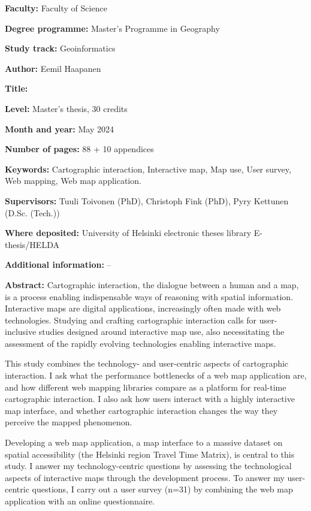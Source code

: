 \begin{spacing}{1}
\setlength{\parskip}{4pt}

\textbf{Faculty:} Faculty of Science

\textbf{Degree programme:} Master's Programme in Geography

\textbf{Study track:} Geoinformatics

\textbf{Author:} Eemil Haapanen

\textbf{Title:} \mytitle

\textbf{Level:} Master's thesis, 30 credits

\textbf{Month and year:} May 2024

\textbf{Number of pages:} 88 + 10 appendices

\textbf{Keywords:}
Cartographic interaction,
Interactive map,
Map use,
User survey,
Web mapping,
Web map application.

\textbf{Supervisors:} Tuuli Toivonen (PhD), Christoph Fink (PhD), Pyry Kettunen (D.Sc. (Tech.))

\textbf{Where deposited:} University of Helsinki electronic theses library E-thesis/HELDA

\textbf{Additional information:} --

\textbf{Abstract:}
Cartographic interaction, the dialogue between a human and a map, is
a process enabling indispensable ways of reasoning with spatial information.
Interactive maps are digital applications,
increasingly often made with web technologies.
Studying and crafting cartographic interaction calls for
user-inclusive studies designed around interactive map use,
also necessitating the assessment of the rapidly evolving technologies enabling interactive maps.

This study combines the technology- and user-centric aspects of cartographic interaction.
I ask what the performance bottlenecks of a web map application are,
and how different web mapping libraries compare as a platform for real-time cartographic interaction.
I also ask how users interact with a highly interactive map interface,
and whether cartographic interaction changes the way they perceive the mapped phenomenon.

Developing a web map application,
a map interface to a massive dataset on spatial accessibility (the Helsinki region Travel Time Matrix),
is central to this study.
I answer my technology-centric questions by assessing the technological aspects of interactive maps
through the development process.
To answer my user-centric questions,
I carry out a user survey (n=31) by combining the web map application with an online questionnaire.


\end{spacing}
